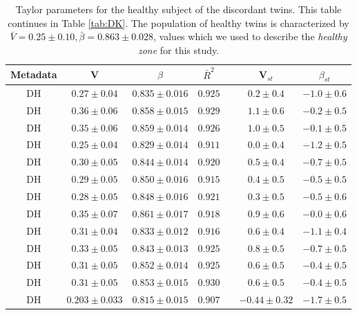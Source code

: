  \begin{table} 
  \begin{center}
    \begin{tabular}{ccccccc}
	    \hline
		Metadata&V&$\beta$&$\bar{R}^2$&&V$_{st}$&$\beta_{st}$\\
		\hline
		DH&$0.27 \pm 0.04$&$0.835 \pm 0.016$&$0.925$&&$0.2 \pm 0.4$&$-1.0 \pm 0.6$\\
		DH&$0.36 \pm 0.06$&$0.858 \pm 0.015$&$0.929$&&$1.1 \pm 0.6$&$-0.2 \pm 0.5$\\
		DH&$0.35 \pm 0.06$&$0.859 \pm 0.014$&$0.926$&&$1.0 \pm 0.5$&$-0.1 \pm 0.5$\\
		DH&$0.25 \pm 0.04$&$0.829 \pm 0.014$&$0.911$&&$0.0 \pm 0.4$&$-1.2 \pm 0.5$\\
		DH&$0.30 \pm 0.05$&$0.844 \pm 0.014$&$0.920$&&$0.5 \pm 0.4$&$-0.7 \pm 0.5$\\
		DH&$0.29 \pm 0.05$&$0.850 \pm 0.016$&$0.915$&&$0.4 \pm 0.5$&$-0.5 \pm 0.5$\\
		DH&$0.28 \pm 0.05$&$0.848 \pm 0.016$&$0.921$&&$0.3 \pm 0.5$&$-0.5 \pm 0.6$\\
		DH&$0.35 \pm 0.07$&$0.861 \pm 0.017$&$0.918$&&$0.9 \pm 0.6$&$-0.0 \pm 0.6$\\
		DH&$0.31 \pm 0.04$&$0.833 \pm 0.012$&$0.916$&&$0.6 \pm 0.4$&$-1.1 \pm 0.4$\\
		DH&$0.33 \pm 0.05$&$0.843 \pm 0.013$&$0.925$&&$0.8 \pm 0.5$&$-0.7 \pm 0.5$\\
		DH&$0.31 \pm 0.05$&$0.852 \pm 0.014$&$0.925$&&$0.6 \pm 0.5$&$-0.4 \pm 0.5$\\
		DH&$0.31 \pm 0.05$&$0.853 \pm 0.015$&$0.930$&&$0.6 \pm 0.5$&$-0.4 \pm 0.5$\\
		DH&$0.203 \pm 0.033$&$0.815 \pm 0.015$&$0.907$&&$-0.44 \pm 0.32$&$-1.7 \pm 0.5$\\
		\hline
    \end{tabular}
  \end{center}
  \caption{Taylor parameters for the healthy subject of the discordant twins\cite{kwashiorkor}. This table continues in Table \ref{tab:DK}. The population of healthy twins is characterized by $\bar{V} = 0.25 \pm 0.10, \bar{\beta} = 0.863 \pm 0.028$, values which we used to describe the \emph{healthy zone} for this study.}
  \label{tab:DH}
\end{table}

